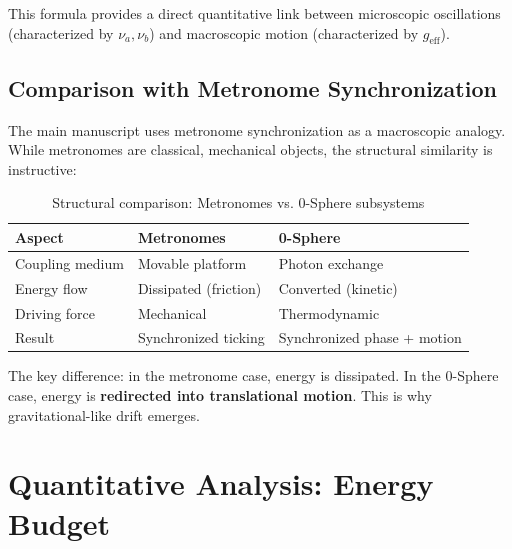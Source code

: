 \documentclass[12pt,letterpaper]{article}
\begin{document}
This formula provides a direct quantitative link between microscopic oscillations (characterized by $\nu_a, \nu_b$) and macroscopic motion (characterized by $g_\text{eff}$).


\subsection{Comparison with Metronome Synchronization}
\label{subsec:metronome_comparison}

The main manuscript uses metronome synchronization as a macroscopic analogy. While metronomes are classical, mechanical objects, the structural similarity is instructive:

\begin{table}[h!]
\centering
\caption{Structural comparison: Metronomes vs. 0-Sphere subsystems}
\begin{tabular}{lll}
\toprule
\textbf{Aspect} & \textbf{Metronomes} & \textbf{0-Sphere} \\
\midrule
Coupling medium & Movable platform & Photon exchange \\
Energy flow & Dissipated (friction) & Converted (kinetic) \\
Driving force & Mechanical & Thermodynamic \\
Result & Synchronized ticking & Synchronized phase + motion \\
\bottomrule
\end{tabular}
\end{table}

The key difference: in the metronome case, energy is dissipated. In the 0-Sphere case, energy is \textbf{redirected into translational motion}. This is why gravitational-like drift emerges.


\section{Quantitative Analysis: Energy Budget}
\label{sec:quantitative}

\justifying

\end{document}
